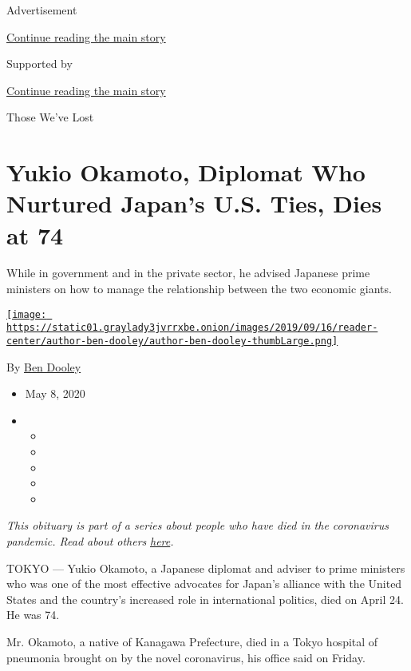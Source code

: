 Advertisement

\protect\hyperlink{after-top}{Continue reading the main story}

Supported by

\protect\hyperlink{after-sponsor}{Continue reading the main story}

Those We've Lost

\hypertarget{yukio-okamoto-diplomat-who-nurtured-japans-us-ties-dies-at-74}{%
\section{Yukio Okamoto, Diplomat Who Nurtured Japan's U.S. Ties, Dies at
74}\label{yukio-okamoto-diplomat-who-nurtured-japans-us-ties-dies-at-74}}

While in government and in the private sector, he advised Japanese prime
ministers on how to manage the relationship between the two economic
giants.

\href{https://www.nytimes3xbfgragh.onion/by/ben-dooley}{\texttt{[image: https://static01.graylady3jvrrxbe.onion/images/2019/09/16/reader-center/author-ben-dooley/author-ben-dooley-thumbLarge.png]}}

By \href{https://www.nytimes3xbfgragh.onion/by/ben-dooley}{Ben Dooley}

\begin{itemize}
\item
  May 8, 2020
\item
  \begin{itemize}
  \item
  \item
  \item
  \item
  \item
  \end{itemize}
\end{itemize}

\emph{This obituary is part of a series about people who have died in
the coronavirus pandemic. Read about others}
\href{https://www.nytimes3xbfgragh.onion/series/people-who-have-died-of-the-coronavirus}{\emph{here}}\emph{.}

TOKYO --- Yukio Okamoto, a Japanese diplomat and adviser to prime
ministers who was one of the most effective advocates for Japan's
alliance with the United States and the country's increased role in
international politics, died on April 24. He was 74.

Mr. Okamoto, a native of Kanagawa Prefecture, died in a Tokyo hospital
of pneumonia brought on by the novel coronavirus, his office said on
Friday.

